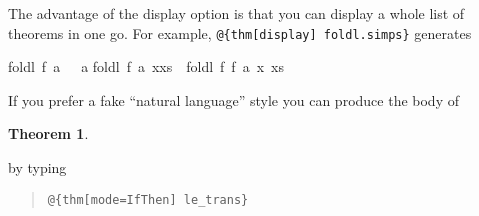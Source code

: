 \begin{isabellebody}
\begin{isamarkuptext}
The advantage of the display option is that you can display a whole
list of theorems in one go. For example,
\verb!@!\verb!{thm[display] foldl.simps}!
generates \begin{isabelle}%
foldl\ f\ a\ {\isacharbrackleft}{\isacharbrackright}\ {\isacharequal}\ a\isasep\isanewline%
foldl\ f\ a\ {\isacharparenleft}x{\isasymcdot}xs{\isacharparenright}\ {\isacharequal}\ foldl\ f\ {\isacharparenleft}f\ a\ x{\isacharparenright}\ xs%
\end{isabelle}%
\end{isamarkuptext}%
\isamarkuptrue%
%
\isamarkuptrue%
%
\begin{isamarkuptext}%
If you prefer a fake ``natural language'' style you can produce
the body of
\newtheorem{theorem}{Theorem}
\begin{theorem}
\end{theorem}
by typing
\begin{quote}
\verb!@!\verb!{thm[mode=IfThen] le_trans}!
\end{quote}


\end{isamarkuptext}
\end{isabellebody}
